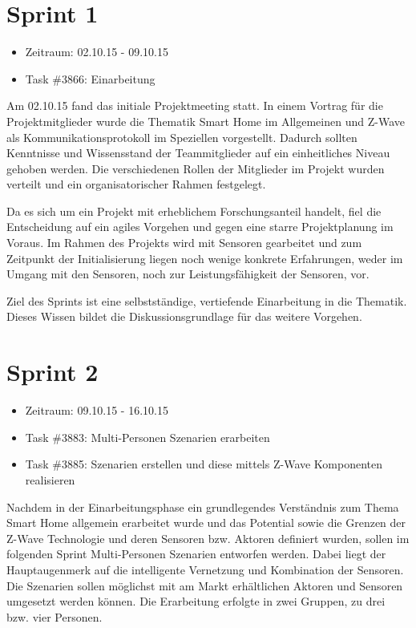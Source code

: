 \documentclass[12pt, oneside, smallheadings]{scrbook}
\begin{document}
\section{Sprint 1}
\begin{itemize}
	\item Zeitraum: 02.10.15 - 09.10.15 \newline
	\item Task \#3866: Einarbeitung\\
\end{itemize}
\noindent
Am 02.10.15 fand das initiale Projektmeeting statt. In einem Vortrag für die Projektmitglieder wurde die Thematik Smart Home im Allgemeinen und Z-Wave als Kommunikationsprotokoll im Speziellen vorgestellt. Dadurch sollten Kenntnisse und Wissensstand der Teammitglieder auf ein einheitliches Niveau gehoben werden. Die verschiedenen Rollen der Mitglieder im Projekt wurden verteilt und ein organisatorischer Rahmen festgelegt.

Da es sich um ein Projekt mit erheblichem Forschungsanteil handelt, fiel die Entscheidung auf ein agiles Vorgehen und gegen eine starre Projektplanung im Voraus. Im Rahmen des Projekts wird mit Sensoren gearbeitet und zum Zeitpunkt der Initialisierung liegen noch wenige konkrete Erfahrungen, weder im Umgang  mit den Sensoren, noch zur Leistungsfähigkeit der Sensoren, vor.

Ziel des Sprints ist eine selbstständige, vertiefende Einarbeitung in die Thematik. Dieses Wissen bildet die Diskussionsgrundlage für das weitere Vorgehen.
\newpage
\section{Sprint 2}
\begin{itemize}
	\item Zeitraum: 09.10.15 - 16.10.15 \newline
	\item Task \#3883: Multi-Personen Szenarien erarbeiten
	\item Task \#3885: Szenarien erstellen und diese mittels Z-Wave Komponenten realisieren\\
\end{itemize}
\noindent
Nachdem in der Einarbeitungsphase ein grundlegendes Verständnis zum Thema Smart Home allgemein erarbeitet wurde und das Potential sowie die Grenzen der Z-Wave Technologie und deren Sensoren bzw. Aktoren definiert wurden, sollen im folgenden Sprint Multi-Personen Szenarien entworfen werden. Dabei liegt der Hauptaugenmerk auf die intelligente Vernetzung und Kombination der Sensoren. Die Szenarien sollen möglichst mit am Markt erhältlichen Aktoren und Sensoren umgesetzt werden können. Die Erarbeitung erfolgte in zwei Gruppen, zu drei bzw. vier Personen.
\end{document}
